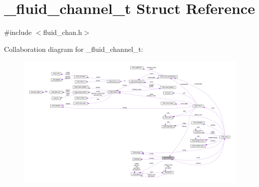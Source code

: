 \hypertarget{struct__fluid__channel__t}{}\section{\+\_\+fluid\+\_\+channel\+\_\+t Struct Reference}
\label{struct__fluid__channel__t}


{\ttfamily \#include $<$fluid\+\_\+chan.\+h$>$}



Collaboration diagram for \+\_\+fluid\+\_\+channel\+\_\+t\+:
\nopagebreak
\begin{figure}[H]
\begin{center}
\leavevmode
\includegraphics[width=350pt]{struct__fluid__channel__t__coll__graph}
\end{center}
\end{figure}
